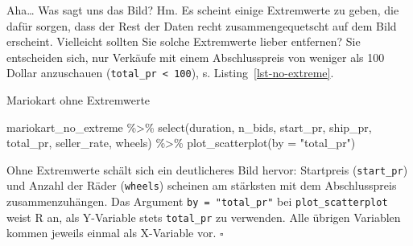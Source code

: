 \documentclass[
  letterpaper,
  oneside,
  open=any]{scrbook}
\newenvironment{Shaded}{\begin{snugshade}}{\end{snugshade}}
\newcommand{\AttributeTok}[1]{\textcolor[rgb]{0.40,0.45,0.13}{#1}}
\newcommand{\DecValTok}[1]{\textcolor[rgb]{0.68,0.00,0.00}{#1}}
\newcommand{\FunctionTok}[1]{\textcolor[rgb]{0.28,0.35,0.67}{#1}}
\newcommand{\NormalTok}[1]{\textcolor[rgb]{0.00,0.23,0.31}{#1}}
\newcommand{\OtherTok}[1]{\textcolor[rgb]{0.00,0.23,0.31}{#1}}
\newcommand{\SpecialCharTok}[1]{\textcolor[rgb]{0.37,0.37,0.37}{#1}}
\newcommand{\StringTok}[1]{\textcolor[rgb]{0.13,0.47,0.30}{#1}}
\theoremstyle{definition}
\theoremstyle{definition}
\theoremstyle{definition}
\theoremstyle{remark}
\begin{document}
Aha\ldots{} Was sagt uns das Bild? Hm. Es scheint einige Extremwerte zu
geben, die dafür sorgen, dass der Rest der Daten recht
zusammengequetscht auf dem Bild erscheint. Vielleicht sollten Sie solche
Extremwerte lieber entfernen? Sie entscheiden sich, nur Verkäufe mit
einem Abschlusspreis von weniger als 100 Dollar anzuschauen
(\texttt{total\_pr\ \textless{}\ 100}), s. Listing~\ref{lst-no-extreme}.

\begin{codelisting}

\caption{\label{lst-no-extreme}Mariokart ohne Extremwerte}

\centering{

\begin{Shaded}
\begin{Highlighting}[]
\NormalTok{mariokart\_no\_extreme }\OtherTok{\textless{}{-}}
\NormalTok{  mariokart }\SpecialCharTok{\%\textgreater{}\%} 
  \FunctionTok{filter}\NormalTok{(total\_pr }\SpecialCharTok{\textless{}} \DecValTok{100}\NormalTok{)}
\end{Highlighting}
\end{Shaded}

}

\end{codelisting}%

\begin{Shaded}
\begin{Highlighting}[]
\NormalTok{mariokart\_no\_extreme }\SpecialCharTok{\%\textgreater{}\%} 
  \FunctionTok{select}\NormalTok{(duration, n\_bids, start\_pr, }
\NormalTok{         ship\_pr, total\_pr, }
\NormalTok{         seller\_rate, wheels) }\SpecialCharTok{\%\textgreater{}\%} 
  \FunctionTok{plot\_scatterplot}\NormalTok{(}\AttributeTok{by =} \StringTok{"total\_pr"}\NormalTok{)}
\end{Highlighting}
\end{Shaded}

Ohne Extremwerte schält sich ein deutlicheres Bild hervor: Startpreis
(\texttt{start\_pr}) und Anzahl der Räder (\texttt{wheels}) scheinen am
stärksten mit dem Abschlusspreis zusammenzuhängen. Das Argument
\texttt{by\ =\ "total\_pr"} bei \texttt{plot\_scatterplot} weist R an,
als Y-Variable stets \texttt{total\_pr} zu verwenden. Alle übrigen
Variablen kommen jeweils einmal als X-Variable vor. \(\square\)
\end{document}
